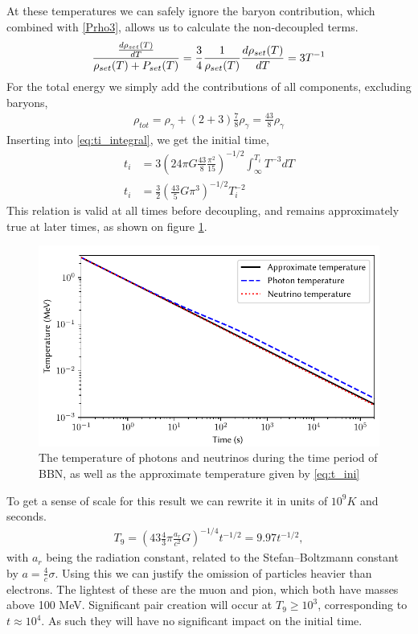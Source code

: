 At these temperatures we can safely ignore the baryon contribution, which combined with \eqref{Prho3}, allows us to calculate the non-decoupled terms.
\begin{align}
    \frac{\frac{d\rho_{set}(T)}{dT}}{\rho_{set}(T) + P_{set}(T)}=\frac{3}{4}\frac{1}{\rho_{set}(T)}\frac{d\rho_{set}(T)}{dT}=3T^{-1}
\end{align}
For the total energy we simply add the contributions of all components, excluding baryons,
\begin{align}
    \rho_{tot}=\rho_\gamma+(2+3)\frac{7}{8}\rho_\gamma=\frac{43}{8}\rho_\gamma
\end{align}
Inserting into \eqref{eq:ti_integral}, we get the initial time,
\begin{align}
    t_i&=3(24\pi G\frac{43}{8}\frac{\pi^2}{15})^{-1/2}\int_{\infty}^{T_i}T^{-3}dT\\
    t_i&=\frac{3}{2}( \frac{43}{5}G\pi^3)^{-1/2}T_i^{-2}
    \label{eq:t_ini}
\end{align}
This relation is valid at all times before decoupling, and remains approximately true at later times, as shown on figure \ref{fig:Temperature}.
\begin{figure}[ht]
    \includegraphics[width=5.1in]{figures/Temperature.pdf}
    \caption{The temperature of photons and neutrinos during the time period of BBN, as well as the approximate temperature given by \eqref{eq:t_ini}}
    \label{fig:Temperature}
\end{figure}

To get a sense of scale for this result we can rewrite it in units of $10^9K$ and seconds.
\begin{align}
    T_9=( 43 \frac{4}{3}\pi\frac{a_r}{c^2}G)^{-1/4}t^{-1/2}=9.97t^{-1/2},
    \label{eq:T9_ini}
\end{align}
with $a_r$ being the radiation constant, related to the Stefan–Boltzmann constant by $a=\frac{4}{c}\sigma$. 
Using this we can justify the omission of particles heavier than electrons. The lightest of these are the muon and pion, which both have masses above 100 MeV. Significant pair creation will occur at $T_9 \geq 10^3$, corresponding to $t\approx10^4$. As such they will have no significant impact on the initial time. 

